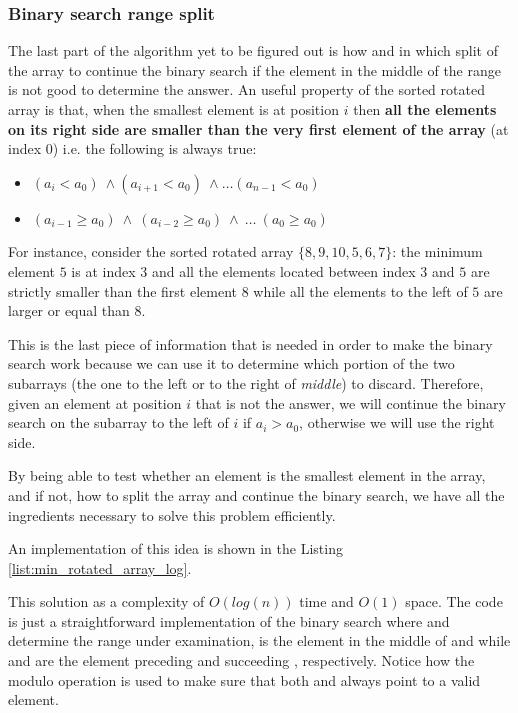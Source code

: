 \subsubsection{Binary search range split}

The last part of the algorithm yet to be figured out is how and in which split of the array to continue the binary search if the element in the middle of the range is not good to determine the answer. An useful property of the sorted rotated array is that, when the smallest element is at position $i$ then \textbf{all the elements on its right side are smaller than the very first element of the array} (at index $0$) i.e. the following is always true:

\begin{itemize}
	\item $	(a_i < a_0) \: \wedge (a_{i+1} < a_0) \: \wedge \ldots (a_{n-1} < a_0) $
	\item $	(a_{i-1} \geq a_0) \: \wedge \: (a_{i-2} \geq a_0) \: \wedge \: \ldots \: (a_{0} \geq a_0) $
\end{itemize}
For instance, consider the sorted rotated array $\{8,9,10,5,6,7\}$: the minimum element $5$ is at index $3$ and all the elements located between index $3$ and $5$ are strictly smaller than the first element $8$ while all the elements to the left of $5$ are larger or equal than $8$.

This is the last piece of information that is needed in order to make the binary search work because we can use it to determine which portion of the two subarrays (the one to the left or to the right of \textit{middle}) to discard. Therefore, given an element at position $i$ that is not the answer, we will continue the binary search on the subarray to the left of $i$ if $a_i > a_0$, otherwise we will use the right side.

By being able to test whether an element is the smallest element in the array, and if not, how to split the array and continue the binary search, we have all the ingredients necessary to solve this problem efficiently.

An implementation of this idea is shown in the Listing \ref{list:min_rotated_array_log}.



This solution as a complexity of $O(log(n))$ time and $O(1)$ space.
The code is just a straightforward implementation of the binary search where  and  determine the range under examination,  is the element in the middle of  and  while  and  are the element preceding and succeeding , respectively. Notice how the modulo operation is used to make sure that both  and  always point to a valid element. 
